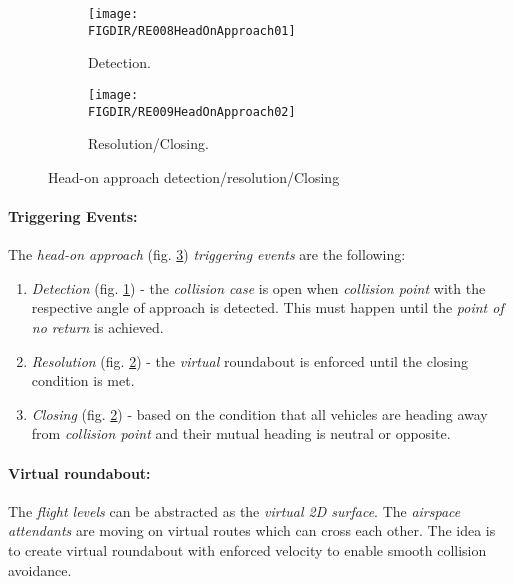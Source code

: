 \begin{figure}[H]
	\centering
    \begin{subfigure}{0.45\textwidth}
    	\centering
        \texttt{[image: \\FIGDIR/RE008HeadOnApproach01]} 
        \caption{Detection.}
        \label{fig:HeadOnApproachTheoreticalDetection}
    \end{subfigure}
    \begin{subfigure}{0.45\textwidth}
    	\centering
        \texttt{[image: \\FIGDIR/RE009HeadOnApproach02]} 
        \caption{Resolution/Closing.}
        \label{fig:HeadOnApproachTheoreticalResolution}
    \end{subfigure}
    \caption{Head-on approach detection/resolution/Closing}
    \label{fig:HeadOnApproachTheoretical}
\end{figure}

\paragraph{Triggering Events:} The \emph{head-on approach} (fig. \ref{fig:HeadOnApproachTheoretical}) \emph{triggering events} are the following:
\begin{enumerate}
    \item \emph{Detection} (fig. \ref{fig:HeadOnApproachTheoreticalDetection}) - the \emph{collision case} is open when \emph{collision point} with the respective angle of approach is detected. This must happen until the \emph{point of no return} is achieved. 
    
    \item \emph{Resolution} (fig. \ref{fig:HeadOnApproachTheoreticalResolution}) - the \emph{virtual} roundabout is enforced until the closing condition is met. 
    
    \item \emph{Closing} (fig. \ref{fig:HeadOnApproachTheoreticalResolution}) - based on the condition that all vehicles are heading away from \emph{collision point} and their mutual heading is neutral or opposite.
\end{enumerate} 

\paragraph{Virtual roundabout:} The \emph{flight levels} can be abstracted as the  \emph{virtual 2D surface}. The \emph{airspace attendants} are moving on virtual routes which can cross each other. The idea is to create virtual roundabout with enforced velocity to enable smooth collision avoidance.

